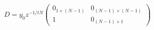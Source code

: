 \begin{equation}
D = y_{0} z^{-1/tN}
   \begin{pmatrix}
   0_{1 \times (N-1)} & 0_{(N-1) \times (N-1)} \\
   1                  & 0_{(N-1) \times 1}
   \end{pmatrix}
\end{equation}


